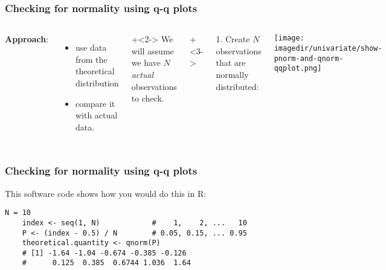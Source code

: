 \begin{frame}\frametitle{Checking for normality using q-q plots}
	\begin{columns}[t]
			\textbf{Approach}: {\color{myOrange}{compare properties}}
			\begin{itemize}
				\item	use data from the theoretical distribution 
				\item	compare it with actual data.
			\end{itemize}
			
			\vspace{24pt}
			\onslide+<2->{
				We will assume we have $N$ \emph{actual} observations to check.
			}
			
			\onslide+<3->{
			1. Create $N$ observations that are normally distributed:
			\begin{center}
				\texttt{[image: \\imagedir/univariate/show-pnorm-and-qnorm-qqplot.png]}
			\end{center}
			}
	\end{columns}

\end{frame}

\begin{frame}[fragile]\frametitle{Checking for normality using q-q plots}
	
	This software code shows how you would do this in R:
	
	\vspace{24pt}
	
	\begin{lstlisting}[R]
	N = 10
	index <- seq(1, N)            #    1,    2, ...   10
	P <- (index - 0.5) / N        # 0.05, 0.15, ... 0.95
	theoretical.quantity <- qnorm(P)
	# [1] -1.64 -1.04 -0.674 -0.385 -0.126
	#      0.125  0.385  0.6744 1.036  1.64
	\end{lstlisting}
	
\end{frame}

